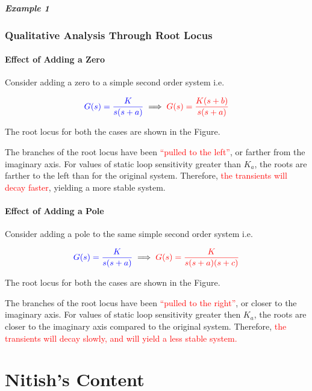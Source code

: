 \documentclass[
  14pt,
  a4paper,
  oneside,
  open=any,
  a4paper,
  14pt]{report}
\begin{document}
\subsubsection{Example 1}\label{example-1-6}

\section{Qualitative Analysis Through Root
Locus}\label{qualitative-analysis-through-root-locus}

\subsection{Effect of Adding a Zero}\label{effect-of-adding-a-zero}

Consider adding a zero to a simple second order system i.e.

\[
    \textcolor{blue}{G(s)=\dfrac{K}{s(s+a)}} \implies \textcolor{red}{G(s)=\dfrac{K(s+b)}{s(s+a)}}
\]

The root locus for both the cases are shown in the Figure.

The branches of the root locus have been \textcolor{red}{``pulled to the
left''}, or farther from the imaginary axis. For values of static loop
sensitivity greater than \(K_a\), the roots are farther to the left than
for the original system. Therefore, \textcolor{red}{the transients will
decay faster}, yielding a more stable system.

\subsection{Effect of Adding a Pole}\label{effect-of-adding-a-pole}

Consider adding a pole to the same simple second order system i.e.

\[
    \textcolor{blue}{G(s)=\dfrac{K}{s(s+a)}} \implies \textcolor{red}{G(s)=\dfrac{K}{s(s+a)(s+c)}}
\]

The root locus for both the cases are shown in the Figure.

The branches of the root locus have been \textcolor{red}{``pulled to the
right''}, or closer to the imaginary axis. For values of static loop
sensitivity greater then \(K_a\), the roots are closer to the imaginary
axis compared to the original system. Therefore, \textcolor{red}{the
transients will decay slowly, and will yield a less stable system.}

\part{Nitish's Content}
\end{document}
